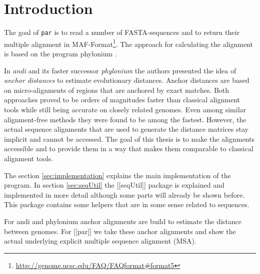 \section{Introduction}

The goal of \texttt{par} is to read a number of FASTA-sequences and to return their multiple alignment in MAF-Format\footnote{\url{http://genome.ucsc.edu/FAQ/FAQformat\#format5}}.
The approach for calculating the alignment is based on the program phylonium \citep{phylonium}. 

In \textit{andi} \citep{andi} and its faster successor \textit{phylonium} \citep{phylonium} the authors presented the idea of \textit{anchor distances} to estimate evolutionary distances. 
Anchor distances are based on micro-alignments of regions that are anchored by exact matches. 
Both approaches proved to be orders of magnitudes faster than classical alignment tools while still being accurate on closely related genomes.
Even among similar alignment-free methods they were found to be among the fastest. 
However, the actual sequence alignments that are used to generate the distance matrices stay implicit and cannot be accessed. 
The goal of this thesis is to make the alignments accessible and to provide them in a way that makes them comparable to classical alignment tools. 

The section \ref{sec:implementation} explains the main implementation of the program.
In section \ref{sec:seqUtil} the [[seqUtil]] package is explained and implemented in more detail although some parts will already be shown before.
This package contains some helpers that are in some sense related to sequences.

For andi \citep{andi} and phylonium \citep{phylonium} anchor alignments are build to estimate the distance between genomes.
For [[par]] we take these anchor alignments and show the actual underlying explicit multiple sequence alignment (MSA).
